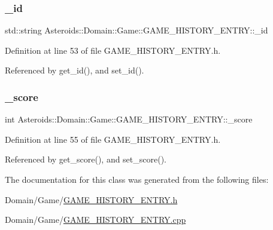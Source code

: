 \subsubsection{\texorpdfstring{\+\_\+id}{\_id}}
{\footnotesize\ttfamily std\+::string Asteroids\+::\+Domain\+::\+Game\+::\+G\+A\+M\+E\+\_\+\+H\+I\+S\+T\+O\+R\+Y\+\_\+\+E\+N\+T\+R\+Y\+::\+\_\+id\hspace{0.3cm}{\ttfamily [private]}}



Definition at line 53 of file G\+A\+M\+E\+\_\+\+H\+I\+S\+T\+O\+R\+Y\+\_\+\+E\+N\+T\+R\+Y.\+h.



Referenced by get\+\_\+id(), and set\+\_\+id().

\mbox{\label{classAsteroids_1_1Domain_1_1Game_1_1GAME__HISTORY__ENTRY_af4eb365a0cb6e5d4951f12287c1fa556}} 
\subsubsection{\texorpdfstring{\+\_\+score}{\_score}}
{\footnotesize\ttfamily int Asteroids\+::\+Domain\+::\+Game\+::\+G\+A\+M\+E\+\_\+\+H\+I\+S\+T\+O\+R\+Y\+\_\+\+E\+N\+T\+R\+Y\+::\+\_\+score\hspace{0.3cm}{\ttfamily [private]}}



Definition at line 55 of file G\+A\+M\+E\+\_\+\+H\+I\+S\+T\+O\+R\+Y\+\_\+\+E\+N\+T\+R\+Y.\+h.



Referenced by get\+\_\+score(), and set\+\_\+score().



The documentation for this class was generated from the following files\+:\begin{DoxyCompactItemize}
\item 
Domain/\+Game/\hyperlink{GAME__HISTORY__ENTRY_8h}{G\+A\+M\+E\+\_\+\+H\+I\+S\+T\+O\+R\+Y\+\_\+\+E\+N\+T\+R\+Y.\+h}\item 
Domain/\+Game/\hyperlink{GAME__HISTORY__ENTRY_8cpp}{G\+A\+M\+E\+\_\+\+H\+I\+S\+T\+O\+R\+Y\+\_\+\+E\+N\+T\+R\+Y.\+cpp}\end{DoxyCompactItemize}
